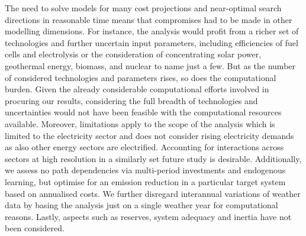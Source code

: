 The need to solve models for many cost projections and near-optimal search
directions in reasonable time means that compromises had to be made in other
modelling dimensions. For instance, the analysis would profit from a richer set
of technologies and further uncertain input parameters, including efficiencies
of fuel cells and electrolysis or the consideration of concentrating solar
power, geothermal energy, biomass, and nuclear to name just a few. But as the
number of considered technologies and parameters rises, so does the
computational burden. Given the already considerable computational efforts
involved in procuring our results, considering the full breadth of technologies
and uncertainties would not have been feasible with the computational resources
available. Moreover, limitations apply to the scope of the analysis which is
limited to the electricity sector and does not consider rising electricity
demands as also other energy sectors are electrified. Accounting for
interactions across sectors at high resolution in a similarly set future study
is desirable. Additionally, we assess no path dependencies via multi-period
investments and endogenous learning, but optimise for an emission reduction in a
particular target system based on annualised costs. We further disregard
interannual variations of weather data by basing the analysis just on a single
weather year for computational reasons. Lastly, aspects such as reserves, system
adequacy and inertia have not been considered.
